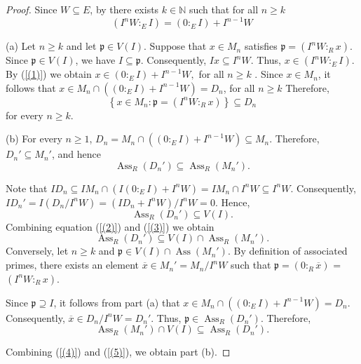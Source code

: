 \documentclass[11pt,reqno]{amsart}
\theoremstyle{definition}
\newcommand{\p}{\mathfrak{p}}
\newcommand{\Ass}{\operatorname{Ass}}
\begin{document}
    \begin{proof}
Since $W\subseteq E$, by \cite[Corollary  2.1]{Dao21} there exists
$k\in\mathbb{N}$ such that for all $n\geq k$
\begin{equation}\label{(1)}
(I^nW:_E I) = (0:_E I)+I^{n-1}W
\end{equation}

\textnormal{(a)}
Let $n\geq k$ and let $\p\in V(I)$.
Suppose that $x\in M_n$ satisfies
$\p=(I^nW:_R x).$
Since $\p\in V(I)$, we have
$I\subseteq\p$. Consequently,
$Ix\subseteq I^nW.$
Thus,
$x\in(I^nW:_E I).$
 By (\ref{(1)}) we obtain
$x\in(0:_E I)+I^{n-1}W,$ for all $n\geq k$ .
Since $x\in M_n$, it follows that
$x\in
M_n\cap\left((0:_E I)+I^{n-1}W\right)=D_n$, for all $n\geq k$
Therefore,
$$\left\{
x\in M_n:
\p=(I^nW:_R x)
\right\}
\subseteq
D_n$$
for every $n\geq k$.
\medskip

\textnormal{(b)}
For every $n\geq 1$, 
$D_n=
M_n\cap\left((0:_E I)+I^{n-1}W\right)\subseteq M_n$. Therefore,
$
D_n'
\subseteq
M_n'$, and hence 
\begin{equation}\label{(2)}
\Ass_R
(D_n')
\subseteq
\Ass_R
(M_n').
\end{equation}

Note that $ID_n\subseteq IM_n\cap \left(I(0:_EI)+I^nW\right)=IM_n\cap I^nW\subseteq I^nW$. Consequently,
$
ID_n'=I\left({D_n}/{I^nW}\right)=\left(ID_n+I^nW\right)/I^nW=0.$ Hence,
\begin{equation}\label{(3)}
  \Ass_R
(D_n')
\subseteq V(I).
 \end{equation}
 Combining equation (\ref{(2)}) and (\ref{(3)}) we obtain
 \begin{equation}\label{(4)}
  \Ass_R(D_n')
\subseteq V(I)\cap \Ass_R(M_n').
 \end{equation}
Conversely, let $n\geq k$ and $\p\in V(I)\cap \Ass
(M_n')$. By definition of associated primes, there exists an element $\overline{x}\in M_n'={M_n}/{I^nW}$ such that 
$\p= (0:_R\overline x)$ = $(I^nW:_R x)$. 

Since $\p\supseteq I$, it follows
from part \textnormal{(a)} that
$x\in
M_n\cap\left((0:_E I)+I^{n-1}W\right)
=D_n.$
Consequently,
$\overline{x}\in{D_n}/{I^nW}=D_n'.$
Thus,
$\p\in
\Ass_R
(D_n').
$
Therefore,
\begin{equation}\label{(5)}
\Ass_R
(M_n')
\cap V(I)
\subseteq
\Ass_R
(D_n').
\end{equation}

Combining
(\ref{(4)}) and
(\ref{(5)}), we obtain part (b).
\end{proof}
\end{document}
